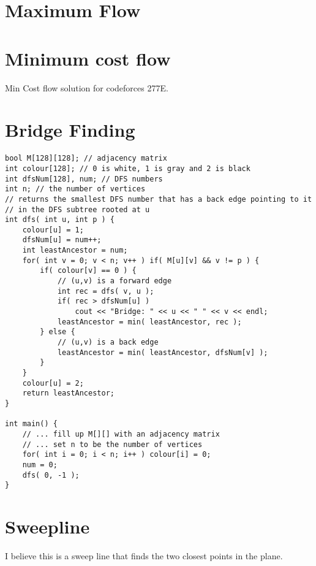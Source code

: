 \documentclass[a4paper,final,8pt]{article}
\begin{document}
\section{Maximum Flow}



\section{Minimum cost flow}

Min Cost flow solution for codeforces 277E.



\section{Bridge Finding}

\begin{lstlisting}
bool M[128][128]; // adjacency matrix
int colour[128]; // 0 is white, 1 is gray and 2 is black
int dfsNum[128], num; // DFS numbers
int n; // the number of vertices
// returns the smallest DFS number that has a back edge pointing to it
// in the DFS subtree rooted at u
int dfs( int u, int p ) {
    colour[u] = 1;
    dfsNum[u] = num++;
    int leastAncestor = num;
    for( int v = 0; v < n; v++ ) if( M[u][v] && v != p ) {
        if( colour[v] == 0 ) {
            // (u,v) is a forward edge
            int rec = dfs( v, u );
            if( rec > dfsNum[u] )
                cout << "Bridge: " << u << " " << v << endl;
            leastAncestor = min( leastAncestor, rec );
        } else {
            // (u,v) is a back edge
            leastAncestor = min( leastAncestor, dfsNum[v] );
        }
    }
    colour[u] = 2;
    return leastAncestor;
}

int main() {
    // ... fill up M[][] with an adjacency matrix
    // ... set n to be the number of vertices
    for( int i = 0; i < n; i++ ) colour[i] = 0;
    num = 0;
    dfs( 0, -1 );
}
\end{lstlisting}


\section{Sweepline}

I believe this is a sweep line that finds the two closest points in the plane.
\end{document}
